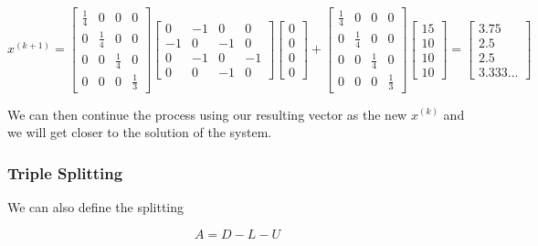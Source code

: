 \[
    x^{(k + 1)} = 
    \begin{bmatrix}
        \frac{1}{4} & 0 & 0 & 0 \\ 
        0 & \frac{1}{4} & 0 & 0 \\ 
        0 & 0 & \frac{1}{4} & 0 \\
        0 & 0 & 0 & \frac{1}{3} 
    \end{bmatrix}
    \begin{bmatrix}
        0 & -1 & 0 & 0 \\ 
        -1 & 0 & -1 & 0 \\ 
        0 & -1 & 0 & -1 \\ 
        0 & 0 & -1 & 0
    \end{bmatrix}
    \begin{bmatrix}
       0 \\ 
       0 \\ 
        0 \\
        0 
    \end{bmatrix}
    + 
    \begin{bmatrix}
       \frac{1}{4} & 0 & 0 & 0 \\ 
        0 & \frac{1}{4} & 0 & 0 \\ 
        0 & 0 & \frac{1}{4} & 0 \\
        0 & 0 & 0 & \frac{1}{3} 
    \end{bmatrix}
    \begin{bmatrix}
        15 \\ 
        10 \\ 
        10 \\ 
        10
    \end{bmatrix}
    = 
    \begin{bmatrix}
        3.75 \\ 
        2.5 \\ 
        2.5 \\ 
        3.333\ldots
    \end{bmatrix}
\]

We can then continue the process using our resulting vector as the new \(x^{(k)}\) and we will get closer to the solution of the system.

\subsubsection*{Triple Splitting}

We can also define the splitting 

\[
    A = D - L - U
\]

